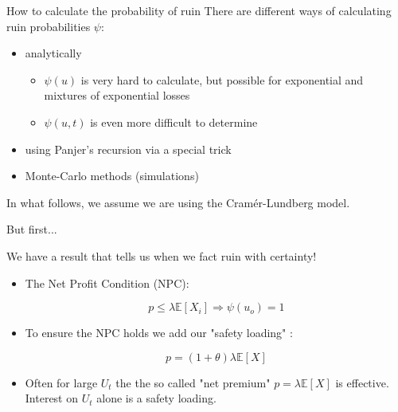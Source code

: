 \documentclass[11pt]{beamer}
\newcommand{\expect}{\mathbb{E}}
\begin{document}
\begin{frame}{How to calculate the probability of ruin}
There are different ways of calculating ruin probabilities $\psi$:

\vfill

\begin{itemize}
\item analytically
\begin{itemize}
\item $\psi(u)$ is very hard to calculate, but possible for exponential and mixtures of exponential losses
\item $\psi(u,t)$ is even more difficult to determine
\end{itemize}

\vfill

\item using Panjer's recursion via a special trick

\vfill

\item Monte-Carlo methods (simulations)
\end{itemize}

\vfill

In what follows, we assume we are using the Cram\'er-Lundberg model.
\end{frame}
\begin{frame}{ But first... }

We have a result that tells us when we \alert{fact ruin with certainty!}

\begin{itemize}

\item The Net Profit Condition (NPC):

\begin{equation*}\label{Def:NPC}
p\leq \lambda \expect[X_i] \Rightarrow \psi(u_o)=1
\end{equation*} 
\vfill
\item To ensure the NPC holds we add our "safety loading" : 

\begin{equation*}
p=(1+\theta)\lambda \expect[X]
\end{equation*}

\vfill
\item Often for large $U_t$ the the so called "net premium" $p=\lambda \expect[X]$ is effective. Interest on $U_t$ alone is a safety loading.

\end{itemize}

\end{frame}
\end{document}
